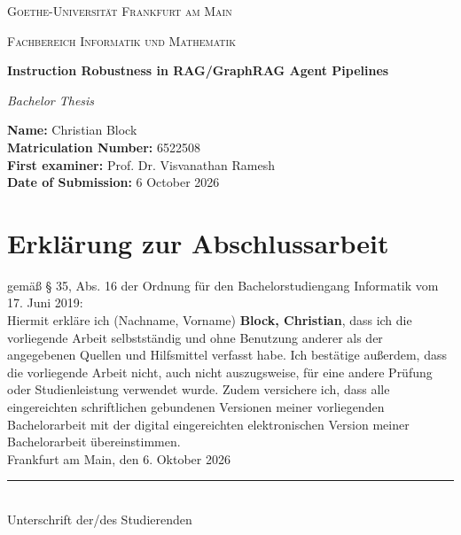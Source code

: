 \documentclass[12pt,a4paper,oneside]{scrreprt}
\begin{document}

\begin{titlepage}
    \centering
    \vspace*{1cm}
    \vspace{1cm}
    {\scshape\LARGE Goethe-Universität Frankfurt am Main \par}
    \vspace{0.5cm}
    {\scshape\Large Fachbereich Informatik und Mathematik \par}
    \vspace{2cm}
    {\huge\bfseries Instruction Robustness in RAG/GraphRAG Agent Pipelines \par}
    \vspace{1.5cm}
    {\Large\itshape Bachelor Thesis \par}
    \vspace{2cm}
    \begin{flushleft}
        \large
        \textbf{Name:} Christian Block \\
        \textbf{Matriculation Number:} 6522508 \\
        \textbf{First examiner:} Prof. Dr. Visvanathan Ramesh \\
        \textbf{Date of Submission:} 6 October 2026
    \end{flushleft}
    \vfill
\end{titlepage}

\chapter*{Erklärung zur Abschlussarbeit}
gemäß § 35, Abs. 16 der Ordnung für den Bachelorstudiengang Informatik vom 17. Juni 2019:\\
Hiermit erkläre ich (Nachname, Vorname) \textbf{Block, Christian}, dass ich die vorliegende Arbeit selbstständig und ohne Benutzung anderer als der angegebenen Quellen und Hilfsmittel verfasst habe. Ich bestätige außerdem, dass die vorliegende Arbeit nicht, auch nicht auszugsweise, für eine andere Prüfung oder Studienleistung verwendet wurde. Zudem versichere ich, dass alle eingereichten schriftlichen gebundenen Versionen meiner vorliegenden Bachelorarbeit mit der digital eingereichten elektronischen Version meiner Bachelorarbeit übereinstimmen.\\
Frankfurt am Main, den 6. Oktober 2026 \hfill \rule{5cm}{0.4pt}\\
\hspace*{0pt}\hfill Unterschrift der/des Studierenden
\end{document}
